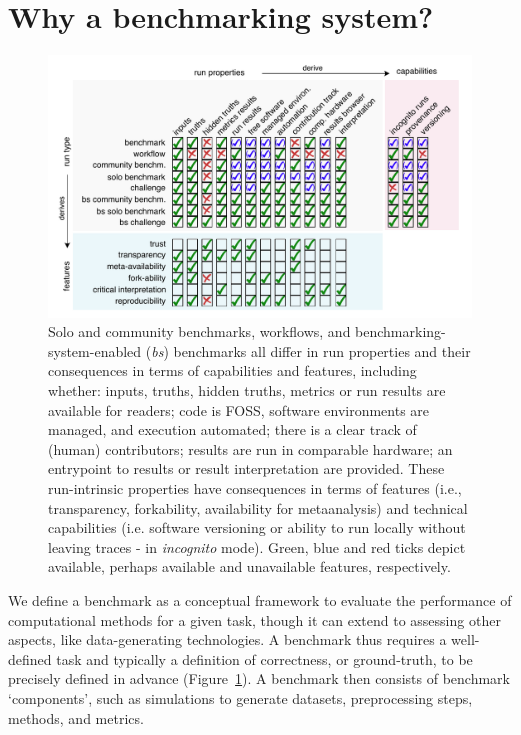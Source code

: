 \documentclass[11pt]{article}
\begin{document}
\section*{Why a benchmarking system?}


\begin{figure}
    \centering
    \includegraphics[width=\linewidth]{figures/fig1_fig_benchmarking_aligned.pdf}
     \caption[Run types, properties, capabilities and features.]{Solo and community benchmarks, workflows, and benchmarking-system-enabled (\textit{bs}) benchmarks all differ in run properties and their consequences in terms of capabilities and features, including whether: inputs, truths, hidden truths, metrics or run results are available for readers; code is FOSS, software environments are managed, and execution automated; there is a clear track of (human) contributors; results are run in comparable hardware; an entrypoint to results or result interpretation are provided. These run-intrinsic properties have consequences in terms of features (i.e., transparency, forkability, availability for metaanalysis) and technical capabilities (i.e. software versioning or ability to run locally without leaving traces - in \textit{incognito} mode). Green, blue and red ticks depict available, perhaps available and unavailable features, respectively. \label{fig:definitions}}
    
\end{figure}


We define a benchmark as a conceptual framework to evaluate the performance of computational methods for a given task, though it can extend to assessing other aspects, like data-generating technologies. A benchmark thus requires a well-defined task and typically a definition of correctness, or ground-truth, to be precisely defined in advance  (Figure~\ref{fig:definitions}). A benchmark then consists of benchmark `components', such as simulations to generate datasets, preprocessing steps, methods, and metrics. 
\end{document}
